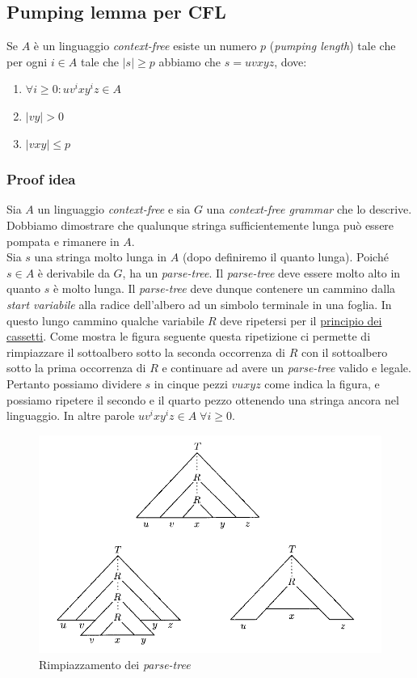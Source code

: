 \documentclass[italian]{article}
\newcommand{\len}[1]{\text{$|#1|$}}
\begin{document}
	\subsection{Pumping lemma per CFL}
	Se $A$ è un linguaggio \textit{context-free} esiste un numero $p$ (\textit{pumping length}) tale che per ogni $i \in A$ tale che $\len{s} \geq p$ abbiamo che $s = uvxyz$, dove:
	\begin{enumerate}
		\item $\forall i \geq 0 : uv^ixy^iz \in A$
		\item $|vy| > 0$
		\item $|vxy| \leq p$		
	\end{enumerate}
	\subsubsection{Proof idea}
	Sia $A$ un linguaggio \textit{context-free} e sia $G$ una \textit{context-free grammar} che lo descrive. Dobbiamo dimostrare che qualunque stringa sufficientemente lunga può essere pompata e rimanere in $A$.\\
	
	\noindent
	Sia $s$ una stringa molto lunga in $A$ (dopo definiremo il quanto lunga). Poiché $s \in A$ è derivabile da $G$, ha un \textit{parse-tree}. Il \textit{parse-tree} deve essere molto alto in quanto $s$ è molto lunga. Il \textit{parse-tree} deve dunque contenere un cammino dalla \textit{start variabile} alla radice dell'albero ad un simbolo terminale in una foglia. In questo lungo cammino qualche variabile $R$ deve ripetersi per il \href{https://it.wikipedia.org/wiki/Principio_dei_cassetti}{principio dei cassetti}. Come mostra le figura seguente questa ripetizione ci permette di rimpiazzare il sottoalbero sotto la seconda occorrenza di $R$ con il sottoalbero sotto la prima occorrenza di $R$ e continuare ad avere un \textit{parse-tree} valido e legale. \\
	
	\noindent
	Pertanto possiamo dividere $s$ in cinque pezzi $vuxyz$ come indica la figura, e possiamo ripetere il secondo e il quarto pezzo ottenendo una stringa ancora nel linguaggio. In altre parole $uv^ixy^iz \in A \; \forall i \geq 0$. 
	\begin{figure}[h]
		\centering
		\includegraphics[width=0.7\linewidth]{images/parse_tree_cfl}
		\caption[Rimpiazzamento dei \textit{parse-tree}]{Rimpiazzamento dei \textit{parse-tree}}
		\label{fig:parsetreecfl}
	\end{figure}
\end{document}
